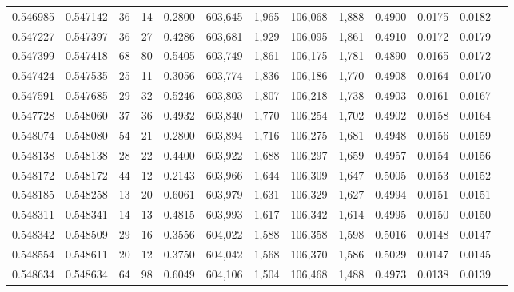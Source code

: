 \begin{tabular}{rrrrrrrrrrrrr}
0.546985 & 0.547142 &    36 &    14 &                                     0.2800 & 603,645 &   1,965 & 106,068 &   1,888 & 0.4900 & 0.0175 & 0.0182 \\
0.547227 & 0.547397 &    36 &    27 &                                     0.4286 & 603,681 &   1,929 & 106,095 &   1,861 & 0.4910 & 0.0172 & 0.0179 \\
0.547399 & 0.547418 &    68 &    80 &                                     0.5405 & 603,749 &   1,861 & 106,175 &   1,781 & 0.4890 & 0.0165 & 0.0172 \\
0.547424 & 0.547535 &    25 &    11 &                                     0.3056 & 603,774 &   1,836 & 106,186 &   1,770 & 0.4908 & 0.0164 & 0.0170 \\
0.547591 & 0.547685 &    29 &    32 &                                     0.5246 & 603,803 &   1,807 & 106,218 &   1,738 & 0.4903 & 0.0161 & 0.0167 \\
0.547728 & 0.548060 &    37 &    36 &                                     0.4932 & 603,840 &   1,770 & 106,254 &   1,702 & 0.4902 & 0.0158 & 0.0164 \\
0.548074 & 0.548080 &    54 &    21 &                                     0.2800 & 603,894 &   1,716 & 106,275 &   1,681 & 0.4948 & 0.0156 & 0.0159 \\
0.548138 & 0.548138 &    28 &    22 &                                     0.4400 & 603,922 &   1,688 & 106,297 &   1,659 & 0.4957 & 0.0154 & 0.0156 \\
0.548172 & 0.548172 &    44 &    12 &                                     0.2143 & 603,966 &   1,644 & 106,309 &   1,647 & 0.5005 & 0.0153 & 0.0152 \\
0.548185 & 0.548258 &    13 &    20 &                                     0.6061 & 603,979 &   1,631 & 106,329 &   1,627 & 0.4994 & 0.0151 & 0.0151 \\
0.548311 & 0.548341 &    14 &    13 &                                     0.4815 & 603,993 &   1,617 & 106,342 &   1,614 & 0.4995 & 0.0150 & 0.0150 \\
0.548342 & 0.548509 &    29 &    16 &                                     0.3556 & 604,022 &   1,588 & 106,358 &   1,598 & 0.5016 & 0.0148 & 0.0147 \\
0.548554 & 0.548611 &    20 &    12 &                                     0.3750 & 604,042 &   1,568 & 106,370 &   1,586 & 0.5029 & 0.0147 & 0.0145 \\
0.548634 & 0.548634 &    64 &    98 &                                     0.6049 & 604,106 &   1,504 & 106,468 &   1,488 & 0.4973 & 0.0138 & 0.0139 \\

\end{tabular}

